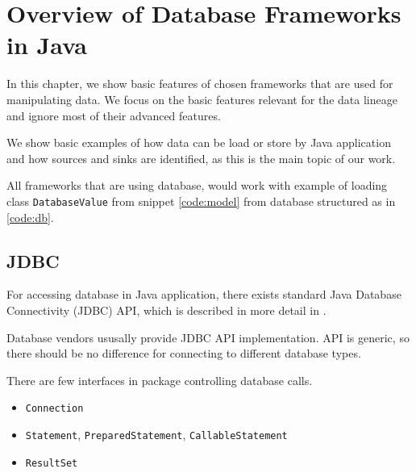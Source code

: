 \newcommand{\InsertCode}[2]{\begin{figure}[#1]\end{figure}}

\newcommand{\Code}[1]{\texttt{#1}}

\chapter{Overview of Database Frameworks in Java \label{frameworks}}


In this chapter, we show basic features of chosen frameworks
that are used for manipulating data.
We focus on the basic features relevant for the data lineage
and ignore most of their advanced features.

We show basic examples of how data can be load or store by Java application
and how sources and sinks are identified, as this is the main topic of our work.

All frameworks that are using database, would work with example
of loading class \Code{DatabaseValue} from snippet \ref{code:model}
from database structured as in \ref{code:db}.

\InsertCode{h}{code/model}






\section{JDBC \label{frameworks:jdbc}}

For accessing database in Java application, there exists standard Java Database Connectivity (JDBC) API,
which is described in more detail in \citet{JDBC_OVERVIEW}.

Database vendors ususally provide JDBC API implementation. API is generic, so
there should be no difference for connecting to different database types.

There are few interfaces in \citet{java.sql} package controlling database calls.
\begin{itemize}
  \item \Code{Connection}
  \item \Code{Statement}, \Code{PreparedStatement}, \Code{CallableStatement}
  \item \Code{ResultSet}
\end{itemize}


